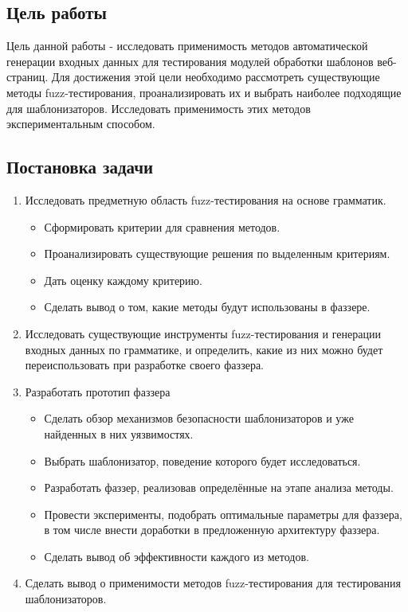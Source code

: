 \documentclass[a4paper]{article}
\begin{document}
\subsection{Цель работы}

Цель данной работы - исследовать применимость методов автоматической генерации входных данных для тестирования модулей обработки шаблонов веб-страниц. Для достижения этой цели необходимо рассмотреть существующие методы fuzz-тестирования, проанализировать их и выбрать наиболее подходящие для шаблонизаторов. Исследовать применимость этих методов экспериментальным способом.



\subsection{Постановка задачи}
\begin{enumerate}
    \item Исследовать предметную область fuzz-тестирования на основе грамматик.
        \begin{itemize}
        \item Сформировать критерии для сравнения методов.
        \item Проанализировать существующие решения по выделенным критериям.
        \item Дать оценку каждому критерию.
        \item Сделать вывод о том, какие методы будут использованы в фаззере.
        \end{itemize}
    \item Исследовать существующие инструменты fuzz-тестирования и генерации входных данных по грамматике, и определить, какие из них можно будет переиспользовать при разработке своего фаззера.
    \item Разработать прототип фаззера
        \begin{itemize}
        \item Сделать обзор механизмов безопасности шаблонизаторов и уже найденных в них уязвимостях.
        \item Выбрать шаблонизатор, поведение которого будет исследоваться.
        \item Разработать фаззер, реализовав определённые на этапе анализа методы.
        \item Провести эксперименты, подобрать оптимальные параметры для фаззера, в том числе внести доработки в предложенную архитектуру фаззера. 
        \item Сделать вывод об эффективности каждого из методов.
        \end{itemize} 
    \item Сделать вывод о применимости методов fuzz-тестирования для тестирования шаблонизаторов.
\end{enumerate}
\end{document}
